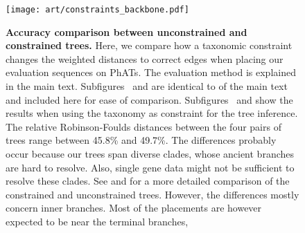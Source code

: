 \begin{figure}[hpbt]
    \centering
    \texttt{[image: art/constraints\_backbone.pdf]}
    \begin{subfigure}{0pt}
        \label{fig:constraints_backbone:sub:edge_unconstr}
    \end{subfigure}
    \begin{subfigure}{0pt}
        \label{fig:constraints_backbone:sub:edge_constr}
    \end{subfigure}
    \begin{subfigure}{0pt}
        \label{fig:constraints_backbone:sub:branch_unconstr}
    \end{subfigure}
    \begin{subfigure}{0pt}
        \label{fig:constraints_backbone:sub:branch_constr}
    \end{subfigure}
    \caption[Accuracy comparison between unconstrained and constrained trees]{
        \textbf{Accuracy comparison between unconstrained and constrained trees.}
        Here, we compare how a taxonomic constraint changes the weighted distances to correct edges
        when placing our evaluation sequences on \acp{PhAT}.
        The evaluation method is explained in the main text.
        Subfigures~
        and  are identical to
         of the main text and included here for ease of comparison.
        Subfigures~
        and  show the results when using the
         taxonomy as constraint for the tree inference.
        The relative Robinson-Foulds distances \citep{Robinson1981}
        between the four pairs of trees range between \num{45.8}\% and \num{49.7}\%.
        The differences probably occur because our trees span diverse clades,
        whose ancient branches are hard to resolve. %
        Also, single gene data might not be sufficient to resolve these clades.
        See  and 
        for a more detailed comparison of the constrained and unconstrained trees.
        However, the differences mostly concern inner branches.
        Most of the placements are however expected to be near the terminal branches,
}
\end{figure}
